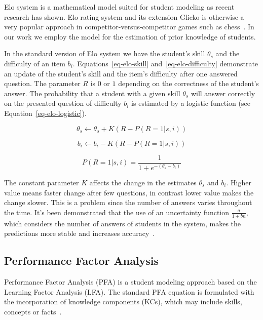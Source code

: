 Elo system is a mathematical model suited for student modeling as recent research has shown. Elo rating system and its extension Glicko is otherwise a very popular approach in competitor-versus-competitor games such as chess~\cite{Vanek2014}. In our work we employ the model for the estimation of prior knowledge of students.

In the standard version of Elo system we have the student's skill $\theta_s$ and the difficulty of an item $b_i$. Equations~\ref{eq-elo-skill} and~\ref{eq-elo-difficulty} demonstrate an update of the student's skill and the item's difficulty after one answered question. The parameter $R$ is $0$ or $1$ depending on the correctness of the student's answer. The probability that a student with a given skill $\theta_s$ will answer correctly on the presented question of difficulty $b_i$ is estimated by a logistic function (see Equation~\ref{eq-elo-logistic}).

\begin{equation} \label{eq-elo-skill}
  \theta_s \gets \theta_s + K(R - P(R = 1|s,i))
\end{equation}

\begin{equation} \label{eq-elo-difficulty}
  b_i \gets b_i - K(R - P(R = 1|s,i))
\end{equation}

\begin{equation} \label{eq-elo-logistic}
  P(R = 1|s,i) = \frac{1}{1 + e^{-(\theta_s - b_i)}}
\end{equation}

The constant parameter $K$ affects the change in the estimates $\theta_s$ and $b_i$. Higher value means faster change after few questions, in contrast lower value makes the change slower. This is a problem since the number of answers varies throughout the time. It's been demonstrated that the use of an uncertainty function $\frac{a}{1 + bn}$, which considers the number of answers of students in the system, makes the predictions more stable and increases accuracy~\cite{Vanek2014}.

\subsection{Performance Factor Analysis}
\label{pfa}

Performance Factor Analysis (PFA) is a student modeling approach based on the Learning Factor Analysis (LFA). The standard PFA equation is formulated with the incorporation of knowledge components (KCs), which may include skills, concepts or facts~\cite{Pavlik2009}.

